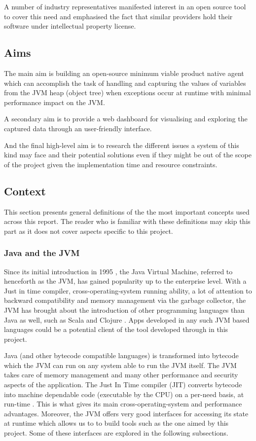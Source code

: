 A number of industry representatives manifested interest in an open source tool to cover this need and emphasised the fact that similar providers hold their software under intellectual property license.

\subsection{Aims}
The main aim is building an open-source minimum viable product native agent which can accomplish the task of handling and capturing the values of variables from the JVM heap (object tree) when exceptions occur at runtime with minimal performance impact on the JVM. 

A secondary aim is to provide a web dashboard for visualising and exploring the captured data through an user-friendly interface.

And the final high-level aim is to research the different issues a system of this kind may face and their potential solutions even if they might be out of the scope of the project given the implementation time and resource constraints.

\subsection{Context}
This section presents general definitions of the the most important concepts used across this report. The reader who is familiar with these definitions may skip this part as it does not cover aspects specific to this project.

\subsubsection{Java and the JVM}
Since its initial introduction in 1995 \cite{javaPerfJVM}, the Java Virtual Machine, referred to henceforth as the JVM, has gained popularity up to the enterprise level. With a Just in time compiler, cross-operating-system running ability, a lot of attention to backward compatibility and memory management via the garbage collector, the JVM has brought about the introduction of other programming languages than Java as well, such as Scala and Clojure \cite{jvmLangs}. Apps developed in any such JVM based languages could be a potential client of the tool developed through in this project.

Java (and other bytecode compatible languages) is transformed into bytecode which the JVM can run on any system able to run the JVM itself. The JVM takes care of memory management and many other performance and security aspects of the application. The Just In Time compiler (JIT) converts bytecode into machine dependable code (executable by the CPU) on a per-need basis, at run-time \cite{javaCompilerJVM}. This is what gives its main cross-operating-system and performance advantages. Moreover, the JVM offers very good interfaces for accessing its state at runtime which allows us to to build tools such as the one aimed by this project. Some of these interfaces are explored in the following subsections.

